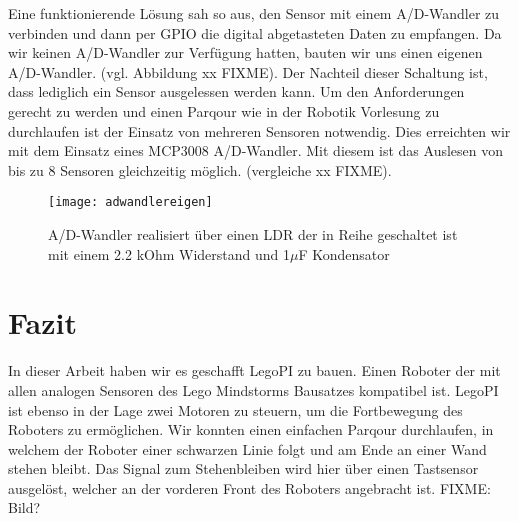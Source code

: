 Eine funktionierende Lösung sah so aus, den Sensor mit einem A/D-Wandler zu verbinden und dann per GPIO die digital abgetasteten Daten zu empfangen. Da wir keinen A/D-Wandler zur Verfügung hatten, bauten wir uns einen eigenen A/D-Wandler. (vgl. Abbildung xx FIXME). Der Nachteil dieser Schaltung ist, dass lediglich ein Sensor ausgelessen werden kann. Um den Anforderungen gerecht zu werden und einen Parqour wie in der Robotik Vorlesung zu durchlaufen ist der Einsatz von mehreren Sensoren notwendig. Dies erreichten wir mit dem Einsatz eines MCP3008 A/D-Wandler. Mit diesem ist das Auslesen von bis zu 8 Sensoren gleichzeitig möglich. (vergleiche xx FIXME).

\begin{figure}[h]
  \centering
  \texttt{[image: adwandlereigen]}
  \caption{A/D-Wandler realisiert über einen LDR der in Reihe geschaltet ist mit einem 2.2 kOhm Widerstand und 1$\mu$F Kondensator}
  \label{Kap1:Lightsensor}
\end{figure}


\chapter{Fazit}

In dieser Arbeit haben wir es geschafft LegoPI zu bauen. Einen Roboter der mit allen analogen Sensoren des Lego Mindstorms Bausatzes kompatibel ist. LegoPI ist ebenso in der Lage zwei Motoren zu steuern, um die Fortbewegung des Roboters zu ermöglichen. Wir konnten einen einfachen Parqour durchlaufen, in welchem der Roboter einer schwarzen Linie folgt und am Ende an einer Wand stehen bleibt. Das Signal zum Stehenbleiben wird hier über einen Tastsensor ausgelöst, welcher an der vorderen Front des Roboters angebracht ist. FIXME: Bild?